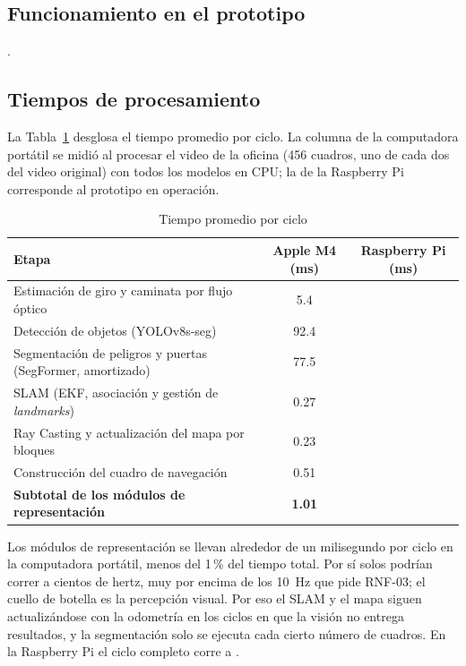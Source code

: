 \subsection{Funcionamiento en el prototipo}

.

\subsection{Tiempos de procesamiento}

La Tabla~\ref{tab:tiempos_ciclo} desglosa el tiempo promedio por ciclo. La columna de
la computadora portátil se midió al procesar el video de la oficina (456 cuadros, uno de
cada dos del video original) con todos los modelos en CPU; la de la Raspberry Pi
corresponde al prototipo en operación.

\begin{table}[H]
\centering
\caption{Tiempo promedio por ciclo}
\label{tab:tiempos_ciclo}
\renewcommand{\arraystretch}{1.2}
\begin{tabular}{|p{7.4cm}|c|c|}
\hline
\textbf{Etapa} & \textbf{Apple M4 (ms)} & \textbf{Raspberry Pi (ms)} \\
\hline
Estimación de giro y caminata por flujo óptico & 5.4 & \TODO{} \\
Detección de objetos (YOLOv8s-seg) & 92.4 & \TODO{} \\
Segmentación de peligros y puertas (SegFormer, amortizado) & 77.5 & \TODO{} \\
\hline
SLAM (EKF, asociación y gestión de \emph{landmarks}) & 0.27 & \TODO{} \\
Ray Casting y actualización del mapa por bloques & 0.23 & \TODO{} \\
Construcción del cuadro de navegación & 0.51 & \TODO{} \\
\hline
\textbf{Subtotal de los módulos de representación} & \textbf{1.01} & \TODO{} \\
\hline
\end{tabular}
\end{table}

Los módulos de representación se llevan alrededor de un milisegundo por ciclo en la
computadora portátil, menos del 1\,\% del tiempo total. Por sí solos podrían correr a
cientos de hertz, muy por encima de los 10~Hz que pide RNF-03; el cuello de botella es la
percepción visual. Por eso el SLAM y el mapa siguen actualizándose con la odometría en
los ciclos en que la visión no entrega resultados, y la segmentación solo se ejecuta cada
cierto número de cuadros. En la Raspberry Pi el ciclo completo corre a .

